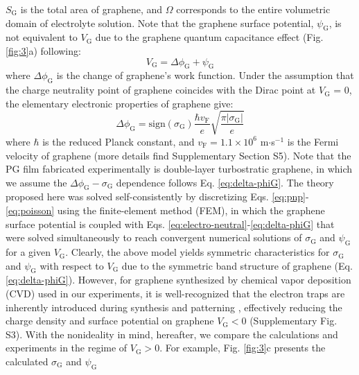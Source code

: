 \documentclass[journal=langd5,email=true, hyperref=true, keywords=false]{achemso}
\newcommand{\Fig}{Fig.}
\begin{document}
$S_{\mathrm{G}}$ is the total area of graphene, and $\Omega$
corresponds to the entire volumetric domain of electrolyte
solution. Note that the graphene surface potential,
$\psi_{\mathrm{G}}$, is not equivalent to $V_{\mathrm{G}}$ due to the
graphene quantum capacitance effect\cite{Xia_2009} (\Fig{}
\ref{fig:3}a) following:
\begin{equation}
  \label{eq:Vg}
  V_{\mathrm{G}} = \Delta \phi_{\mathrm{G}} + \psi_{\mathrm{G}}
\end{equation}
where $\Delta \phi_{\mathrm{G}}$ is the change of graphene’s work
function. Under the assumption that the charge neutrality point of
graphene coincides with the Dirac point at $V_{\mathrm{G}}$ = 0, the elementary
electronic properties of graphene give:
\begin{equation}
  \label{eq:delta-phiG}
  \Delta \phi_{\mathrm{G}} = \mathrm{sign}(\sigma_{\mathrm{G}}) \frac{\hbar v_{\mathrm{F}}}{e}
  \sqrt{\frac{\pi |\sigma_{\mathrm{G}}|}{e}}
\end{equation}
where $\hbar$ is the reduced Planck constant, and
$v_{\mathrm{F}}=1.1\times10^{6}$ m$\cdot$s$^{-1}$ is the Fermi
velocity of graphene (more details find Supplementary Section
S5). Note that the PG film fabricated experimentally is double-layer
turbostratic graphene, in which we assume the
$\Delta \phi_{\mathrm{G}} - \sigma_{\mathrm{G}}$ dependence follows
Eq. \ref{eq:delta-phiG}. The theory proposed here was solved
self-consistently by discretizing Eqs. \ref{eq:pnp}-\ref{eq:poisson}
using the finite-element method (FEM), in which the graphene surface
potential is coupled with
Eqs. \ref{eq:electro-neutral}-\ref{eq:delta-phiG} that were solved
simultaneously to reach convergent numerical solutions of
$\sigma_{\mathrm{G}}$ and $\psi_{\mathrm{G}}$ for a given
$V_{\mathrm{G}}$. Clearly, the above model yields symmetric
characteristics for $\sigma_{\mathrm{G}}$ and $\psi_{\mathrm{G}}$ with
respect to $V_{\mathrm{G}}$ due to the symmetric band structure of
graphene (Eq. \ref{eq:delta-phiG}). However, for graphene synthesized
by chemical vapor deposition (CVD) used in our experiments, it is
well-recognized that the electron traps are inherently introduced
during synthesis and patterning \cite{Dean_2010}, effectively reducing
the charge density and surface potential on graphene
$V_{\mathrm{G}}<0$ (Supplementary \Fig{} S3). With the nonideality in
mind, hereafter, we compare the calculations and experiments in the
regime of $V_{\mathrm{G}}>0$. For example, \Fig{} \ref{fig:3}c
presents the calculated $\sigma_{\mathrm{G}}$ and $\psi_{\mathrm{G}}$
\end{document}
